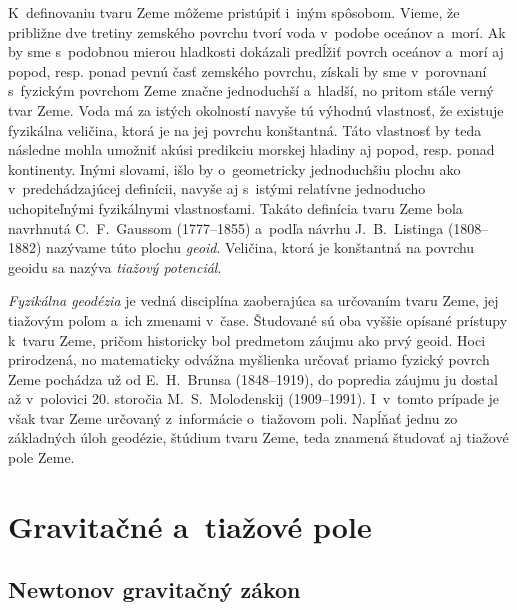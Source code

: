\documentclass[a4paper, 12pt]{book}
\begin{document}
K~definovaniu tvaru Zeme môžeme pristúpiť i~iným spôsobom.  Vieme, že približne 
dve tretiny zemského povrchu tvorí voda v~podobe oceánov a~morí.  Ak by sme 
s~podobnou mierou hladkosti dokázali predĺžiť povrch oceánov a~morí aj popod, 
resp. ponad pevnú časť zemského povrchu, získali by sme v~porovnaní s~fyzickým 
povrchom Zeme značne jednoduchší a~hladší, no pritom stále verný tvar Zeme.  
Voda má za istých okolností navyše tú výhodnú vlastnosť, že existuje fyzikálna 
veličina, ktorá je na jej povrchu konštantná.  Táto vlastnosť by teda následne 
mohla umožniť akúsi predikciu morskej hladiny aj popod, resp. ponad kontinenty.  
Inými slovami, išlo by o~geometricky jednoduchšiu plochu ako v~predchádzajúcej 
definícii, navyše aj s~istými relatívne jednoducho uchopiteľnými fyzikálnymi 
vlastnosťami.  Takáto definícia tvaru Zeme bola navrhnutá C.~F.~Gaussom 
(1777--1855) a~podľa návrhu J.~B.~Listinga (1808--1882) nazývame túto plochu 
\emph{geoid}.  Veličina, ktorá je konštantná na povrchu geoidu sa nazýva 
\emph{tiažový potenciál}.

\emph{Fyzikálna geodézia} je vedná disciplína zaoberajúca sa určovaním tvaru 
Zeme, jej tiažovým poľom a~ich zmenami v~čase.  Študované sú oba vyššie opísané 
prístupy k~tvaru Zeme, pričom historicky bol predmetom záujmu ako prvý geoid.  
Hoci prirodzená, no matematicky odvážna myšlienka určovať priamo fyzický povrch 
Zeme pochádza už od E.~H.~Brunsa (1848--1919), do popredia záujmu ju dostal až 
v~polovici 20. storočia M.~S.~Molodenskij (1909--1991).  I~v~tomto prípade je 
však tvar Zeme určovaný z~informácie o~tiažovom poli.  Napĺňať jednu zo 
základných úloh geodézie, štúdium tvaru Zeme, teda znamená študovať aj tiažové 
pole Zeme.







\chapter{Gravitačné a~tiažové pole}
\label{sec:gravitational_and_gravity_field}






\section{Newtonov gravitačný zákon}
\label{sec:newton_law}
\end{document}
